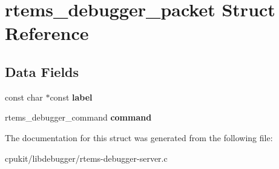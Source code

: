 \hypertarget{structrtems__debugger__packet}{}\section{rtems\+\_\+debugger\+\_\+packet Struct Reference}
\label{structrtems__debugger__packet}
\subsection*{Data Fields}
\begin{DoxyCompactItemize}
\item 
\mbox{\label{structrtems__debugger__packet_a229dffe278bba7f6b6a498fa1e6ee3cb}} 
const char $\ast$const {\bfseries label}
\item 
\mbox{\label{structrtems__debugger__packet_ae88ed73247080d4323ee1ed05259844c}} 
rtems\+\_\+debugger\+\_\+command {\bfseries command}
\end{DoxyCompactItemize}


The documentation for this struct was generated from the following file\+:\begin{DoxyCompactItemize}
\item 
cpukit/libdebugger/rtems-\/debugger-\/server.\+c\end{DoxyCompactItemize}
